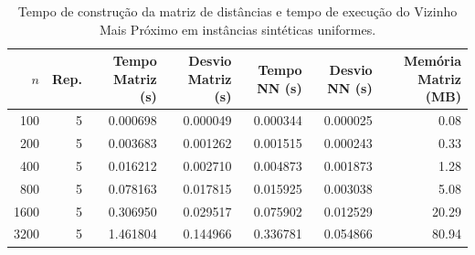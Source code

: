 \begin{table}[htbp]
\centering
\small
\caption{Tempo de construção da matriz de distâncias e tempo de execução do Vizinho Mais Próximo em instâncias sintéticas uniformes.}
\label{tab:nn_sintetico}
\begin{tabular}{rrrrrrr}
\toprule
$n$ & Rep. & Tempo Matriz (s) & Desvio Matriz (s) & Tempo NN (s) & Desvio NN (s) & Memória Matriz (MB) \\
\midrule
100 & 5 & 0.000698 & 0.000049 & 0.000344 & 0.000025 & 0.08 \\
200 & 5 & 0.003683 & 0.001262 & 0.001515 & 0.000243 & 0.33 \\
400 & 5 & 0.016212 & 0.002710 & 0.004873 & 0.001873 & 1.28 \\
800 & 5 & 0.078163 & 0.017815 & 0.015925 & 0.003038 & 5.08 \\
1600 & 5 & 0.306950 & 0.029517 & 0.075902 & 0.012529 & 20.29 \\
3200 & 5 & 1.461804 & 0.144966 & 0.336781 & 0.054866 & 80.94 \\
\bottomrule
\end{tabular}
\end{table}
